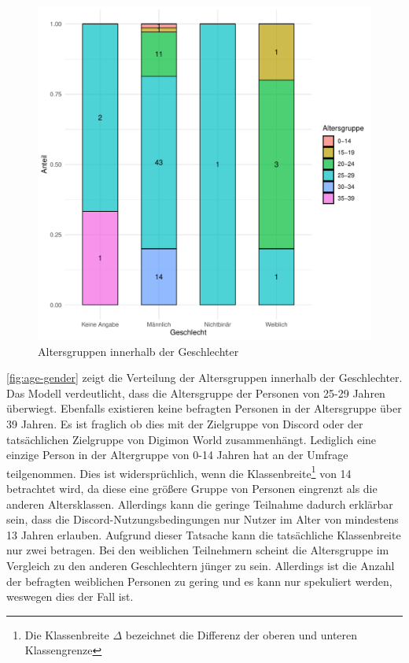 \begin{figure}[H]
\centering
\includegraphics[width=0.65\columnwidth]{figures/plots/age_gender.pdf}
\caption{\label{fig:age-gender} Altersgruppen innerhalb der Geschlechter}
\end{figure}

\autoref{fig:age-gender} zeigt die Verteilung der Altersgruppen innerhalb der Geschlechter. Das Modell verdeutlicht, dass die Altersgruppe der Personen von 25-29 Jahren überwiegt. Ebenfalls existieren keine befragten Personen in der Altersgruppe über 39 Jahren. Es ist fraglich ob dies mit der Zielgruppe von Discord oder der tatsächlichen Zielgruppe von Digimon World zusammenhängt. Lediglich eine einzige Person in der Altergruppe von 0-14 Jahren hat an der Umfrage teilgenommen. Dies ist widersprüchlich, wenn die Klassenbreite\footnote{Die Klassenbreite $\Delta$ bezeichnet die Differenz der oberen und unteren Klassengrenze\cite[S.27]{elementare-stochastik}} von 14 betrachtet wird, da diese eine größere Gruppe von Personen eingrenzt als die anderen Altersklassen. Allerdings kann die geringe Teilnahme dadurch erklärbar sein, dass die Discord-Nutzungsbedingungen nur Nutzer im Alter von mindestens 13 Jahren erlauben. Aufgrund dieser Tatsache kann die tatsächliche Klassenbreite nur zwei betragen. Bei den weiblichen Teilnehmern scheint die Altersgruppe im Vergleich zu den anderen Geschlechtern jünger zu sein. Allerdings ist die Anzahl der befragten weiblichen Personen zu gering und es kann nur spekuliert werden, weswegen dies der Fall ist. \\

